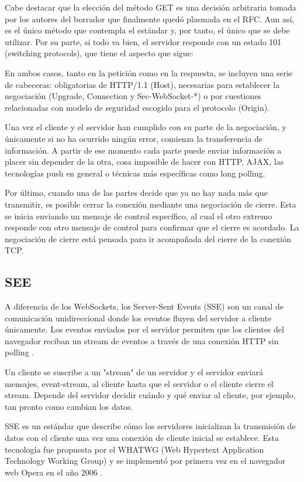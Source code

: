 Cabe destacar que la elección del método GET es una decisión arbitraria tomada por los autores del borrador que finalmente quedó plasmada en el RFC. Aun así, es el único método que contempla el estándar y, por tanto, el único que se debe utilizar. Por su parte, si todo va bien, el servidor responde con un estado 101 (switching protocols), que tiene el aspecto que sigue:

En ambos casos, tanto en la petición como en la respuesta, se incluyen una serie de cabeceras: obligatorias de HTTP/1.1 (Host), necesarias para establecer la negociación (Upgrade, Connection y Sec-WebSocket-*) o por cuestiones relacionadas con modelo de seguridad escogido para el protocolo (Origin).

Una vez el cliente y el servidor han cumplido con su parte de la negociación, y únicamente si no ha ocurrido ningún error, comienza la transferencia de información. A partir de ese momento cada parte puede enviar información a placer sin depender de la otra, cosa imposible de hacer con HTTP, AJAX, las tecnologías push en general o técnicas más específicas como long polling.

Por último, cuando una de las partes decide que ya no hay nada más que transmitir, es posible cerrar la conexión mediante una negociación de cierre. Esta se inicia enviando un mensaje de control específico, al cual el otro extremo responde con otro mensaje de control para confirmar que el cierre es acordado. La negociación de cierre está pensada para ir acompañada del cierre de la conexión TCP.

\subsection{SEE}

A diferencia de los WebSockets, los Server-Sent Events (SSE) son un canal de comunicación unidireccional donde los eventos fluyen del servidor a cliente únicamente. Los eventos enviados por el servidor permiten que los clientes del navegador reciban un stream de eventos a través de una conexión HTTP sin polling \cite{sse2}.

Un cliente se suscribe a un "stream" de un servidor y el servidor enviará mensajes, event-stream, al cliente hasta que el servidor o el cliente cierre el stream. Depende del servidor decidir cuándo y qué enviar al cliente, por ejemplo, tan pronto como cambian los datos.

SSE es un estándar que describe cómo los servidores inicializan la transmisión de datos con el cliente una vez una conexión de cliente inicial se establece. Esta tecnología fue propuesta por el WHATWG (Web Hypertext Application Technology Working Group) y se implementó por primera vez en el navegador web Opera en el año 2006 \cite{sse1}.

